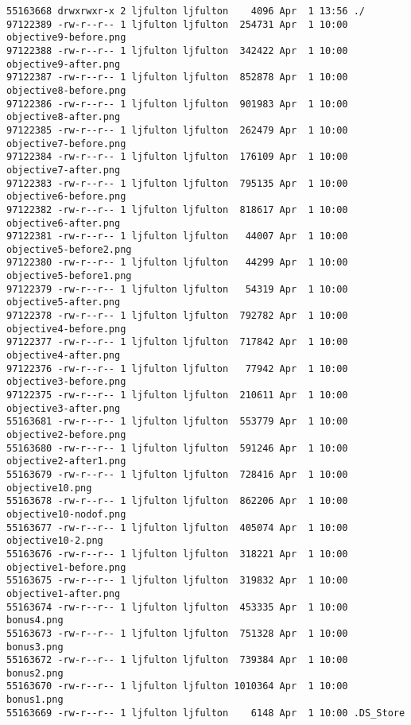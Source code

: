 \documentclass[12pt]{article}
\begin{document}
\begin{verbatim}
55163668 drwxrwxr-x 2 ljfulton ljfulton    4096 Apr  1 13:56 ./
97122389 -rw-r--r-- 1 ljfulton ljfulton  254731 Apr  1 10:00 objective9-before.png
97122388 -rw-r--r-- 1 ljfulton ljfulton  342422 Apr  1 10:00 objective9-after.png
97122387 -rw-r--r-- 1 ljfulton ljfulton  852878 Apr  1 10:00 objective8-before.png
97122386 -rw-r--r-- 1 ljfulton ljfulton  901983 Apr  1 10:00 objective8-after.png
97122385 -rw-r--r-- 1 ljfulton ljfulton  262479 Apr  1 10:00 objective7-before.png
97122384 -rw-r--r-- 1 ljfulton ljfulton  176109 Apr  1 10:00 objective7-after.png
97122383 -rw-r--r-- 1 ljfulton ljfulton  795135 Apr  1 10:00 objective6-before.png
97122382 -rw-r--r-- 1 ljfulton ljfulton  818617 Apr  1 10:00 objective6-after.png
97122381 -rw-r--r-- 1 ljfulton ljfulton   44007 Apr  1 10:00 objective5-before2.png
97122380 -rw-r--r-- 1 ljfulton ljfulton   44299 Apr  1 10:00 objective5-before1.png
97122379 -rw-r--r-- 1 ljfulton ljfulton   54319 Apr  1 10:00 objective5-after.png
97122378 -rw-r--r-- 1 ljfulton ljfulton  792782 Apr  1 10:00 objective4-before.png
97122377 -rw-r--r-- 1 ljfulton ljfulton  717842 Apr  1 10:00 objective4-after.png
97122376 -rw-r--r-- 1 ljfulton ljfulton   77942 Apr  1 10:00 objective3-before.png
97122375 -rw-r--r-- 1 ljfulton ljfulton  210611 Apr  1 10:00 objective3-after.png
55163681 -rw-r--r-- 1 ljfulton ljfulton  553779 Apr  1 10:00 objective2-before.png
55163680 -rw-r--r-- 1 ljfulton ljfulton  591246 Apr  1 10:00 objective2-after1.png
55163679 -rw-r--r-- 1 ljfulton ljfulton  728416 Apr  1 10:00 objective10.png
55163678 -rw-r--r-- 1 ljfulton ljfulton  862206 Apr  1 10:00 objective10-nodof.png
55163677 -rw-r--r-- 1 ljfulton ljfulton  405074 Apr  1 10:00 objective10-2.png
55163676 -rw-r--r-- 1 ljfulton ljfulton  318221 Apr  1 10:00 objective1-before.png
55163675 -rw-r--r-- 1 ljfulton ljfulton  319832 Apr  1 10:00 objective1-after.png
55163674 -rw-r--r-- 1 ljfulton ljfulton  453335 Apr  1 10:00 bonus4.png
55163673 -rw-r--r-- 1 ljfulton ljfulton  751328 Apr  1 10:00 bonus3.png
55163672 -rw-r--r-- 1 ljfulton ljfulton  739384 Apr  1 10:00 bonus2.png
55163670 -rw-r--r-- 1 ljfulton ljfulton 1010364 Apr  1 10:00 bonus1.png
55163669 -rw-r--r-- 1 ljfulton ljfulton    6148 Apr  1 10:00 .DS_Store


\end{verbatim}
\end{document}
